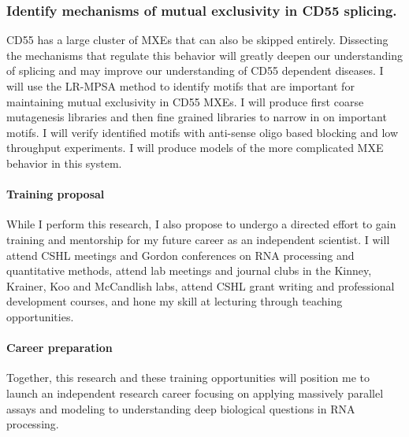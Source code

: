 \documentclass[11pt]{article}
\begin{document}
\subsubsection{Identify mechanisms of mutual exclusivity in CD55 splicing.}
CD55 has a large cluster of MXEs that can also be skipped entirely.
Dissecting the mechanisms that regulate this behavior will greatly deepen our understanding of splicing and may improve our understanding of CD55 dependent diseases.
I will use the LR-MPSA method to identify motifs that are important for maintaining mutual exclusivity in CD55 MXEs.
I will produce first coarse mutagenesis libraries and then fine grained libraries to narrow in on important motifs.
I will verify identified motifs with anti-sense oligo based blocking and low throughput experiments.
I will produce models of the more complicated MXE behavior in this system.
%
\paragraph{Training proposal}
While I perform this research, I also propose to undergo a directed effort to gain training and mentorship for my future career as an independent scientist.
I will attend CSHL meetings and Gordon conferences on RNA processing and quantitative methods, attend lab meetings and journal clubs in the Kinney, Krainer, Koo and McCandlish labs, attend CSHL grant writing and professional development courses, and hone my skill at lecturing through teaching opportunities.
%
\paragraph{Career preparation}
Together, this research and these training opportunities will position me to launch an independent research career focusing on applying massively parallel assays and modeling to understanding deep biological questions in RNA processing.

\printbibliography
\end{document}
